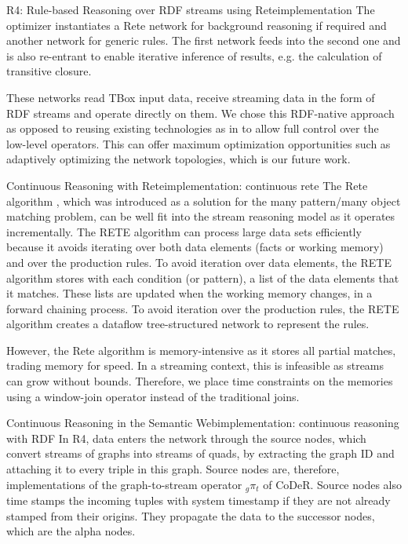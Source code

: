 \begin{nestedsection}{R4: Rule-based Reasoning over RDF streams using Rete}{implementation}
	The optimizer instantiates a Rete network for background reasoning if required and another network for generic rules.
	The first network feeds into the second one and is also re-entrant to enable iterative inference of results, e.g. the calculation of transitive closure.
	
	These networks read TBox input data, receive streaming data in the form of RDF streams and operate directly on them.
	We chose this RDF-native approach as opposed to reusing existing technologies as in \citep{C-SPARQL,streaming-sparql} to allow full control over the low-level operators.
	This can offer maximum optimization opportunities such as adaptively optimizing the network topologies, which is our future work.

	\begin{nestedsection}{Continuous Reasoning with Rete}{implementation: continuous rete}
		The Rete algorithm \citep{forgy79}, which was introduced as a solution for the many pattern/many object matching problem, can be well fit into the stream reasoning model as it operates incrementally.
		The RETE algorithm can process large data sets efficiently because it avoids iterating over both data elements (facts or working memory) and over the production rules.
		To avoid iteration over data elements, the RETE algorithm stores with each condition (or pattern), a list of the data elements that it matches.
		These lists are updated when the working memory changes, in a forward chaining process.
		To avoid iteration over the production rules, the RETE algorithm creates a dataflow tree-structured network to represent the rules.

		However, the Rete algorithm is memory-intensive as it stores all partial matches, trading memory for speed.
		In a streaming context, this is infeasible as streams can grow without bounds.
		Therefore, we place time constraints on the memories using a window-join operator instead of the traditional joins.
	\end{nestedsection}
	\begin{nestedsection}{Continuous Reasoning in the Semantic Web}{implementation: continuous reasoning with RDF}
		In R4, data enters the network through the source nodes, which convert streams of graphs into streams of quads, by extracting the graph ID and attaching it to every triple in this graph.
		Source nodes are, therefore, implementations of the graph-to-stream operator ${{}_g{\pi_t}}$ of CoDeR.
		Source nodes also time stamps the incoming tuples with system timestamp if they are not already stamped from their origins.
		They propagate the data to the successor nodes, which are the alpha nodes.


\end{nestedsection}
\end{nestedsection}
